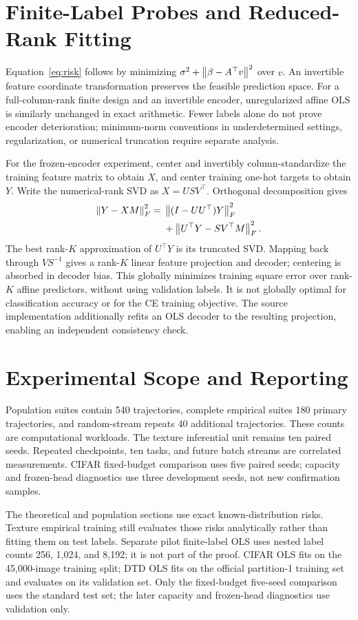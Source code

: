 \section{Finite-Label Probes and Reduced-Rank Fitting}
Equation~\eqref{eq:risk} follows by minimizing $\sigma^2+\left\lVert \beta-A^\top v\right\rVert^2$ over $v$. An invertible feature coordinate transformation preserves the feasible prediction space. For a full-column-rank finite design and an invertible encoder, unregularized affine OLS is similarly unchanged in exact arithmetic. Fewer labels alone do not prove encoder deterioration; minimum-norm conventions in underdetermined settings, regularization, or numerical truncation require separate analysis.

For the frozen-encoder experiment, center and invertibly column-standardize the training feature matrix to obtain $X$, and center training one-hot targets to obtain $Y$. Write the numerical-rank SVD as $X=USV^\top$. Orthogonal decomposition gives
\begin{align}
\left\lVert Y-XM\right\rVert_F^2={}&\left\lVert (I-UU^\top)Y\right\rVert_F^2\nonumber\\
&+\left\lVert U^\top Y-SV^\top M\right\rVert_F^2.
\end{align}
The best rank-$K$ approximation of $U^\top Y$ is its truncated SVD. Mapping back through $VS^{-1}$ gives a rank-$K$ linear feature projection and decoder; centering is absorbed in decoder bias. This globally minimizes training square error over rank-$K$ affine predictors, without using validation labels. It is not globally optimal for classification accuracy or for the CE training objective. The source implementation additionally refits an OLS decoder to the resulting projection, enabling an independent consistency check.

\section{Experimental Scope and Reporting}
\label{app:natural-direction}
Population suites contain 540 trajectories, complete empirical suites 180 primary trajectories, and random-stream repeats 40 additional trajectories. These counts are computational workloads. The texture inferential unit remains ten paired seeds. Repeated checkpoints, ten tasks, and future batch streams are correlated measurements. CIFAR fixed-budget comparison uses five paired seeds; capacity and frozen-head diagnostics use three development seeds, not new confirmation samples.

The theoretical and population sections use exact known-distribution risks. Texture empirical training still evaluates those risks analytically rather than fitting them on test labels. Separate pilot finite-label OLS uses nested label counts 256, 1,024, and 8,192; it is not part of the proof. CIFAR OLS fits on the 45,000-image training split; DTD OLS fits on the official partition-1 training set and evaluates on its validation set. Only the fixed-budget five-seed comparison uses the standard test set; the later capacity and frozen-head diagnostics use validation only.

